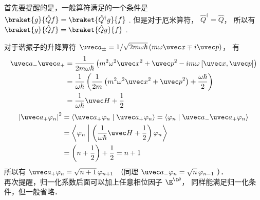 
首先要提醒的是，一般算符满足的一个条件是 $\braket{g}{\hat Q f}=\braket{\hat Q^\dagger g}{ f}$ . 但是对于厄米算符， ${\hat Q^\dagger } = \hat Q$，  所以有 $\braket{g}{\hat Q f} = \braket{\hat Q g}{f}$ .

对于谐振子的升降算符 ${\uvec a_ \pm } = {1}/{{\sqrt {2m\omega \hbar } }}\left( {m\omega \uvec x \mp i\uvec p} \right)$， 有
\begin{equation}\begin{aligned}
{\uvec a_ - }{\uvec a_ + } &= \frac{1}{2m\omega \hbar }\left( {{m^2}{\omega ^2}{{\uvec x}^2} + {{\uvec p}^2} - im\omega {\kern 1pt} {\kern 1pt} [\uvec x,\uvec p]} \right) \\
&= \frac{1}{\omega \hbar }\left( {\frac{1}{2m}\left( {{m^2}{\omega ^2}{{\uvec x}^2} + {{\uvec p}^2}} \right) + \frac{\omega \hbar }{2}} \right) \\
&= \frac{1}{\omega \hbar }\uvec H + \frac{1}{2}
\end{aligned}\end{equation}
\begin{equation}\begin{aligned}
{\left| {{{\uvec a}_ + }{\varphi_n}} \right|^2} &= \left\langle {{{\uvec a}_ + }{\varphi_n}}
\mathrel{\left | {\vphantom {{{{\uvec a}_ + }{\varphi_n}} {{{\uvec a}_ + }{\varphi_n}}}}
\right. \kern-\nulldelimiterspace}
{{{\uvec a}_ + }{\varphi_n}} \right\rangle = \left\langle {\varphi_n}
\mathrel{\left | {\vphantom {{\varphi_n} {{{\uvec a}_ - }{{\uvec a}_ + }{\varphi_n}}}}
\right. \kern-\nulldelimiterspace}
{{{\uvec a}_ - }{{\uvec a}_ + }{\varphi_n}} \right\rangle  \\
&= \left\langle {\varphi_n}
\mathrel{\left | {\vphantom {{\varphi_n} {\left( {\frac{1}{\omega \hbar }\uvec H + \frac{1}{2}} \right){\varphi_n}}}}
\right. \kern-\nulldelimiterspace}
{\left( {\frac{1}{\omega \hbar }\uvec H + \frac{1}{2}} \right){\varphi_n}} \right\rangle \\
&= \left( {n + \frac{1}{2}} \right) + \frac{1}{2} = n + 1
\end{aligned}\end{equation}
所以有 ${\uvec a_ + }{\varphi_n} = \sqrt {n + 1}\, {\varphi_{n + 1}}$ （同理 ${\uvec a_ - }{\varphi_n} = \sqrt n \,{\varphi_{n - 1}}$ ）．\\
再次提醒，归一化系数后面可以加上任意相位因子 ${\E^{\I\theta }}$， 同样能满足归一化条件，但一般省略．